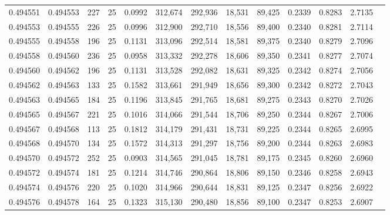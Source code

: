 \begin{tabular}{rrrrrrrrrrrrr}
0.494551 & 0.494553 &   227 &  25 &                                     0.0992 & 312,674 & 292,936 &  18,531 &  89,425 & 0.2339 & 0.8283 & 2.7135 \\
0.494553 & 0.494555 &   226 &  25 &                                     0.0996 & 312,900 & 292,710 &  18,556 &  89,400 & 0.2340 & 0.8281 & 2.7114 \\
0.494555 & 0.494558 &   196 &  25 &                                     0.1131 & 313,096 & 292,514 &  18,581 &  89,375 & 0.2340 & 0.8279 & 2.7096 \\
0.494558 & 0.494560 &   236 &  25 &                                     0.0958 & 313,332 & 292,278 &  18,606 &  89,350 & 0.2341 & 0.8277 & 2.7074 \\
0.494560 & 0.494562 &   196 &  25 &                                     0.1131 & 313,528 & 292,082 &  18,631 &  89,325 & 0.2342 & 0.8274 & 2.7056 \\
0.494562 & 0.494563 &   133 &  25 &                                     0.1582 & 313,661 & 291,949 &  18,656 &  89,300 & 0.2342 & 0.8272 & 2.7043 \\
0.494563 & 0.494565 &   184 &  25 &                                     0.1196 & 313,845 & 291,765 &  18,681 &  89,275 & 0.2343 & 0.8270 & 2.7026 \\
0.494565 & 0.494567 &   221 &  25 &                                     0.1016 & 314,066 & 291,544 &  18,706 &  89,250 & 0.2344 & 0.8267 & 2.7006 \\
0.494567 & 0.494568 &   113 &  25 &                                     0.1812 & 314,179 & 291,431 &  18,731 &  89,225 & 0.2344 & 0.8265 & 2.6995 \\
0.494568 & 0.494570 &   134 &  25 &                                     0.1572 & 314,313 & 291,297 &  18,756 &  89,200 & 0.2344 & 0.8263 & 2.6983 \\
0.494570 & 0.494572 &   252 &  25 &                                     0.0903 & 314,565 & 291,045 &  18,781 &  89,175 & 0.2345 & 0.8260 & 2.6960 \\
0.494572 & 0.494574 &   181 &  25 &                                     0.1214 & 314,746 & 290,864 &  18,806 &  89,150 & 0.2346 & 0.8258 & 2.6943 \\
0.494574 & 0.494576 &   220 &  25 &                                     0.1020 & 314,966 & 290,644 &  18,831 &  89,125 & 0.2347 & 0.8256 & 2.6922 \\
0.494576 & 0.494578 &   164 &  25 &                                     0.1323 & 315,130 & 290,480 &  18,856 &  89,100 & 0.2347 & 0.8253 & 2.6907 \\

\end{tabular}
